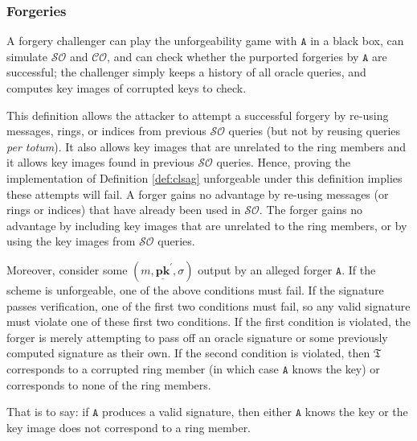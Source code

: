 \documentclass[draft]{llncs} %
\begin{document}
\subsubsection{Forgeries}
A forgery challenger can play the unforgeability game with $\texttt{A}$ in a black box, can simulate $\mathcal{SO}$ and $\mathcal{CO}$, and can check whether the purported forgeries by $\texttt{A}$ are successful; the challenger simply keeps a history of all oracle queries, and computes key images of corrupted keys to check.

This definition allows the attacker to attempt a successful forgery by re-using messages, rings, or indices from previous $\mathcal{SO}$ queries (but not by reusing queries \textit{per totum}). It also allows key images that are unrelated to the ring members and it allows key images found in previous $\mathcal{SO}$ queries. Hence, proving the implementation of Definition \ref{def:clsag} unforgeable under this definition implies these attempts will fail. A forger gains no advantage by re-using messages (or rings or indices) that have already been used in $\mathcal{SO}$. The forger gains no advantage by including key images that are unrelated to the ring members, or by using the key images from $\mathcal{SO}$ queries.

Moreover, consider some $(m, \underline{\textbf{pk}}^\prime, \sigma)$ output by an alleged forger $\texttt{A}$. If the scheme is unforgeable, one of the above conditions must fail. If the signature passes verification, one of the first two conditions must fail, so any valid signature must violate one of these first two conditions. If the first condition is violated, the forger is merely attempting to pass off an oracle signature or some previously computed signature as their own. If the second condition is violated, then $\mathfrak{T}$ corresponds to a corrupted ring member (in which case $\texttt{A}$ knows the key) or corresponds to none of the ring members.

That is to say: if $\texttt{A}$ produces a valid signature, then either $\texttt{A}$ knows the key or the key image does not correspond to a ring member.
\end{document}
